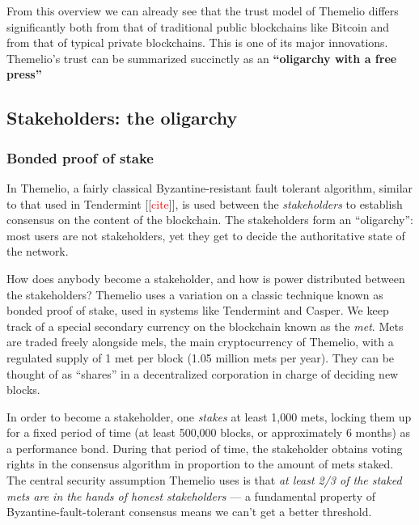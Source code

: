 \documentclass[headinclude]{scrbook}
\newcommand\mytodo[1]{[[\textcolor{red}{#1}]]}
\begin{document}
From this overview we can already see that the trust model of Themelio differs significantly both from that of traditional public blockchains like Bitcoin and from that of typical private blockchains. This is one of its major innovations. Themelio's trust can be summarized succinctly as an \textbf{``oligarchy with a free press''}

\subsection{Stakeholders: the oligarchy}

\subsubsection{Bonded proof of stake}

In Themelio, a fairly classical Byzantine-resistant fault tolerant algorithm, similar to that used in Tendermint \mytodo{cite}, is used between the \emph{stakeholders} to establish consensus on the content of the blockchain. The stakeholders form an ``oligarchy'': most users are not stakeholders, yet they get to decide the authoritative state of the network.


How does anybody become a stakeholder, and how is power distributed between the stakeholders? Themelio uses a variation on a classic technique known as bonded proof of stake, used in systems like Tendermint and Casper. We keep track of a special secondary currency on the blockchain known as the \textit{met}. Mets are traded freely alongside mels, the main cryptocurrency of Themelio, with a regulated supply of 1 met per block (1.05 million mets per year). They can be thought of as ``shares'' in a decentralized corporation in charge of deciding new blocks.

In order to become a stakeholder, one \emph{stakes} at least 1,000 mets, locking them up for a fixed period of time (at least 500,000 blocks, or approximately 6 months) as a performance bond. During that period of time, the stakeholder obtains voting rights in the consensus algorithm in proportion to the amount of mets staked. The central security assumption Themelio uses is that \textit{at least 2/3 of the staked mets are in the hands of honest stakeholders} --- a fundamental property of Byzantine-fault-tolerant consensus means we can't get a better threshold.
\end{document}
